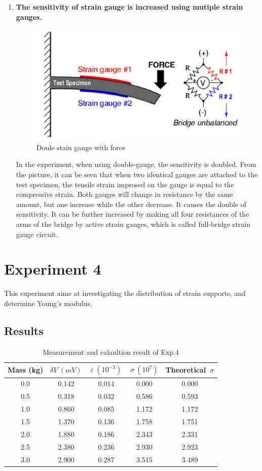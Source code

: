 \documentclass[11pt,a4paper,twoside]{article}
\begin{document}
\begin{enumerate}
\item
\textbf{The sensitivity of strain gauge is increased using mutiple strain gauges.}\\
\begin{figure}[!h]
	\centering
	\includegraphics[width=0.6\linewidth]{6}
	\caption{Doule stain gauge with force}
	\label{f6}
\end{figure}

In the experiment, when using double-gauge, the sensitivity is doubled. From the picture, it can be seen that when two identical gauges are attached to the test specimen, the tensile strain improsed on the gauge is equal to the compressive strain. Both gauges will change in resistance by the same amount, but one increase while the other decrease. It causes the double of sensitivity. It can be further increased by making all four resistances of the arms of the bridge by active strain gauges, which is called full-bridge strain gauge circuit. 
\end{enumerate}


\section{Experiment 4}
This experiment aims at investigating the distribution of strain supports, and determine Young's modulus.

\subsection{Results}

\begin{table}[!h]
	\centering
	\begin{tabular}{|c|c|c|c|c|}
		\hline
		Mass (kg) & $\delta V \ (mV)$ & $\ \varepsilon \ (10^{-3}) \ $ & $\sigma\  (10^{7})$ & Theoretical\ $\sigma $   \\
		\hline\hline
		0.0 & 0.142 & 0.014 &0.000 &0.000\\
		\hline
		0.5 & 0.318 & 0.032 &0.586 &0.593\\
		\hline
		1.0 & 0.860 & 0.085 &1.172 &1.172\\
		\hline
		1.5 & 1.370 & 0.136 &1.758 &1.751\\
		\hline
		2.0 & 1.880 & 0.186 &2.343 &2.331\\
		\hline
		2.5 & 2.380 & 0.236 &2.930 &2.923\\
		\hline
		3.0 & 2.900 & 0.287 &3.515 &3.489\\
		\hline
		
	\end{tabular}
	\caption{Measurement and calaultion result of Exp.4}
	\label{t4}
\end{table}
\end{document}
